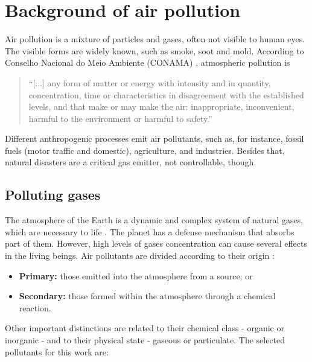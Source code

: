 \section{Background of air pollution}
\label{sec:background}

\BL Air pollution is a mixture of particles and gases, often not visible to human
eyes. The visible forms are widely known, such as smoke, soot and mold.
According to Conselho Nacional do Meio Ambiente (CONAMA)
\cite[own translation]{conama-air-pollution}, atmospheric pollution is 

\begin{quotation}
    ``[...] any form of matter or energy with intensity and in quantity,
    concentration, time or characteristics in disagreement with the
    established levels, and that make or may make the air: inappropriate,
    inconvenient, harmful to the environment or harmful to safety.''
\end{quotation}

Different anthropogenic processes emit air pollutants, such as, for instance,
fossil fuels (motor traffic and domestic), agriculture, and industries.
Besides that, natural disasters are a critical gas emitter, not controllable,
though. 

\subsection{Polluting gases}
\label{sec:polluting-gases}

The atmosphere of the Earth is a dynamic and complex system of natural gases,
which are necessary to life \cite{gases}. The planet has a defense mechanism
that absorbs part of them. However, high levels of gases concentration can cause several effects in the
living beings. Air pollutants are divided according to their origin \cite{who2006}: 

\begin{itemize}
    \item {\bf Primary:} those emitted into the atmosphere from a source; or
    \item {\bf Secondary:} those formed within the atmosphere through a
    chemical reaction.
\end{itemize}

Other important distinctions are related to their chemical class - organic or
inorganic - and to their physical state - gaseous or particulate. The
selected pollutants for this work are: 

